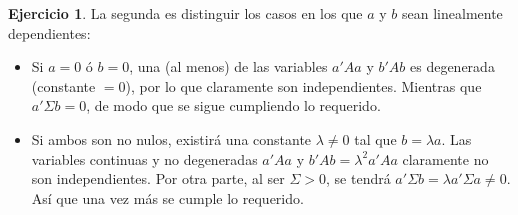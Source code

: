 \documentclass[12pt,spanish]{article}
\theoremstyle{definition}
\newtheorem{exercise}{Ejercicio}
\begin{document}
\begin{exercise}
  La segunda es distinguir los casos en los que $a$ y $b$ sean
  linealmente dependientes:

  \begin{itemize}
  \item Si $a=0$ ó $b=0$, una (al menos) de las variables $a'Aa$ y
    $b'Ab$ es degenerada (constante $=0$), por lo que claramente son
    independientes. Mientras que $a'\Sigma b=0$, de modo que se sigue
    cumpliendo lo requerido.
  \item Si ambos son no nulos, existirá una constante $\lambda\neq 0$
    tal que $b=\lambda a$. Las variables continuas y no degeneradas
    $a'Aa$ y $b'Ab=\lambda^2 a'Aa$ claramente no son
    independientes. Por otra parte, al ser $\Sigma>0$, se tendrá
    $a'\Sigma b=\lambda a'\Sigma a\neq 0$. Así que una vez más se
    cumple lo requerido.
  \end{itemize}
  
\end{exercise}
\end{document}
